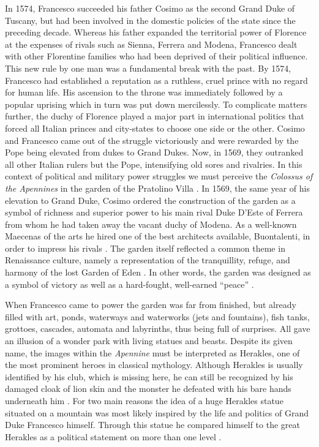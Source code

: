 In 1574, Francesco succeeded his father Cosimo as the second Grand Duke of Tuscany, but had been involved in the domestic policies of the state since the preceding decade. Whereas his father expanded the territorial power of Florence at the expenses of rivals such as Sienna, Ferrera and Modena, Francesco dealt with other Florentine families who had been deprived of their political influence. This new rule by one man was a fundamental break with the past. By 1574, Francesco had established a reputation as a ruthless, cruel prince with no regard for human life. His ascension to the throne was immediately followed by a popular uprising which in turn was put down mercilessly. To complicate matters further, the duchy of Florence played a major part in international politics that forced all Italian princes and city-states to choose one side or the other. Cosimo and Francesco came out of the struggle victoriously and were rewarded by the Pope being elevated from dukes to Grand Dukes. Now, in 1569, they outranked all other Italian rulers but the Pope, intensifying old sores and rivalries. In this context of political and military power struggles we must perceive the \textit{Colossus of the Apennines} in the garden of the Pratolino Villa \parencites[45]{Dhanens1956}[26-33]{Goudriaan2015}[56]{Goldthwaite2009}[250]{Najemy2006}. In 1569, the same year of his elevation to Grand Duke, Cosimo ordered the construction of the garden as a symbol of richness and superior power to his main rival Duke D’Este of Ferrera from whom he had taken away the vacant duchy of Modena. As a well-known Maecenas of the arts he hired one of the best architects available, Buontalenti, in order to impress his rivals \parencites[1]{DElia2011}. The garden itself reflected a common theme in Renaissance culture, namely a representation of the tranquillity, refuge, and harmony of the lost Garden of Eden \parencites[153]{Partridge2009}. In other words, the garden was designed as a symbol of victory as well as a hard-fought, well-earned “peace” \parencites[295-296,302-303]{Goudriaan2015}[168,391]{Goldthwaite2009}.

When Francesco came to power the garden was far from finished, but already filled with art, ponds, waterways and waterworks (jets and fountains), fish tanks, grottoes, cascades, automata and labyrinths, thus being full of surprises. All gave an illusion of a wonder park with living statues and beasts. Despite its given name, the images within the \textit{Apennine} must be interpreted as Herakles, one of the most prominent heroes in classical mythology. Although Herakles is usually identified by his club, which is missing here, he can still be recognized by his damaged cloak of lion skin and the monster he defeated with his bare hands underneath him \parencites[210,216-217]{Moormann2007}. For two main reasons the idea of a huge Herakles statue situated on a mountain was most likely inspired by the life and politics of Grand Duke Francesco himself. Through this statue he compared himself to the great Herakles as a political statement on more than one level \parencites[26,295,303]{Goudriaan2015}[107,168,391,489,513]{Goldthwaite2009}[315,478]{Najemy2006}[216-218]{Moormann2007}.

